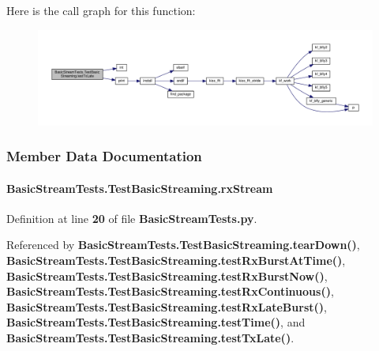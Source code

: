 Here is the call graph for this function\+:
\nopagebreak
\begin{figure}[H]
\begin{center}
\leavevmode
\includegraphics[width=350pt]{d3/d77/classBasicStreamTests_1_1TestBasicStreaming_a4911b9f77a1331aa691d4f1e5b92b0c8_cgraph}
\end{center}
\end{figure}




\subsubsection{Member Data Documentation}
\paragraph[{rx\+Stream}]{\setlength{\rightskip}{0pt plus 5cm}Basic\+Stream\+Tests.\+Test\+Basic\+Streaming.\+rx\+Stream}\label{classBasicStreamTests_1_1TestBasicStreaming_ac7903ccdccfcb408d5eb5da8ccd227fb}


Definition at line {\bf 20} of file {\bf Basic\+Stream\+Tests.\+py}.



Referenced by {\bf Basic\+Stream\+Tests.\+Test\+Basic\+Streaming.\+tear\+Down()}, {\bf Basic\+Stream\+Tests.\+Test\+Basic\+Streaming.\+test\+Rx\+Burst\+At\+Time()}, {\bf Basic\+Stream\+Tests.\+Test\+Basic\+Streaming.\+test\+Rx\+Burst\+Now()}, {\bf Basic\+Stream\+Tests.\+Test\+Basic\+Streaming.\+test\+Rx\+Continuous()}, {\bf Basic\+Stream\+Tests.\+Test\+Basic\+Streaming.\+test\+Rx\+Late\+Burst()}, {\bf Basic\+Stream\+Tests.\+Test\+Basic\+Streaming.\+test\+Time()}, and {\bf Basic\+Stream\+Tests.\+Test\+Basic\+Streaming.\+test\+Tx\+Late()}.

